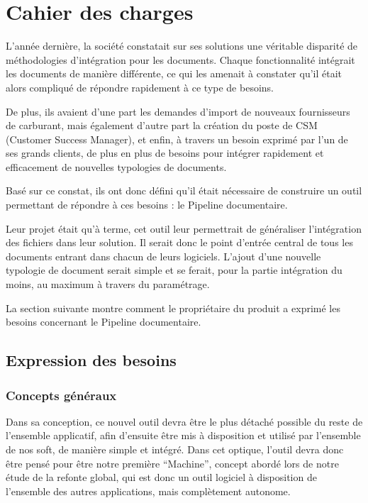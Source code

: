 \chapter{Cahier des charges}\label{ch:cahier}

L'année dernière, la société constatait sur ses solutions une véritable disparité de méthodologies d'intégration pour les documents. Chaque fonctionnalité intégrait les documents de manière différente, ce qui les amenait à constater qu'il était alors compliqué de répondre rapidement à ce type de besoins.

De plus, ils avaient d'une part les demandes d'import de nouveaux fournisseurs de carburant, mais également d'autre part la création du poste de CSM (Customer Success Manager), et enfin, à travers un besoin exprimé par l'un de ses grands clients, de plus en plus de besoins pour intégrer rapidement et efficacement de nouvelles typologies de documents.

Basé sur ce constat, ils ont donc défini qu'il était nécessaire de construire un outil permettant de répondre à ces besoins : le Pipeline documentaire.

Leur projet était qu'à terme, cet outil leur permettrait de généraliser l'intégration des fichiers dans leur solution. Il serait donc le point d'entrée central de tous les documents entrant dans chacun de leurs logiciels. L'ajout d'une nouvelle typologie de document serait simple et se ferait, pour la partie intégration du moins, au maximum à travers du paramétrage.

La section suivante montre comment le propriétaire du produit a exprimé les besoins concernant le Pipeline documentaire.

\section{Expression des besoins}

\subsection{Concepts généraux}

Dans sa conception, ce nouvel outil devra être le plus détaché possible du reste de l'ensemble applicatif, afin d'ensuite être mis à disposition et utilisé par l'ensemble de nos soft, de manière simple et intégré. Dans cet optique, l'outil devra donc être pensé pour être notre première ``Machine'', concept abordé lors de notre étude de la refonte global, qui est donc un outil logiciel à disposition de l'ensemble des autres applications, mais complètement autonome.

